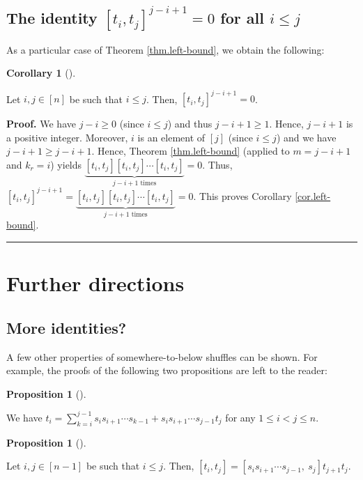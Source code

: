 \documentclass[numbers=enddot,12pt,final,onecolumn,notitlepage]{scrartcl}%
\theoremstyle{definition}
\newtheorem{prop}[theo]{Proposition}
\newenvironment{proposition}[1][]
{\begin{prop}[#1]\begin{leftbar}}
{\end{leftbar}\end{prop}}
\newtheorem{coro}[theo]{Corollary}
\newenvironment{corollary}[1][]
{\begin{coro}[#1]\begin{leftbar}}
{\end{leftbar}\end{coro}}
\newenvironment{proof}[1][Proof]{\noindent\textbf{#1.} }{\ \rule{0.5em}{0.5em}}
\let\sumnonlimits\sum
\renewcommand{\sum}{\sumnonlimits\limits}
\begin{document}
\subsection{The identity $\left[  t_{i},t_{j}\right]  ^{j-i+1}=0$ for all
$i\leq j$}

As a particular case of Theorem \ref{thm.left-bound}, we obtain the following:

\begin{corollary}
\label{cor.left-bound}Let $i,j\in\left[  n\right]  $ be such that $i\leq j$.
Then, $\left[  t_{i},t_{j}\right]  ^{j-i+1}=0$.
\end{corollary}

\begin{proof}
We have $j-i\geq0$ (since $i\leq j$) and thus $j-i+1\geq1$. Hence, $j-i+1$ is
a positive integer. Moreover, $i$ is an element of $\left[  j\right]  $ (since
$i\leq j$) and we have $j-i+1\geq j-i+1$. Hence, Theorem \ref{thm.left-bound}
(applied to $m=j-i+1$ and $k_{r}=i$) yields $\underbrace{\left[  t_{i}%
,t_{j}\right]  \left[  t_{i},t_{j}\right]  \cdots\left[  t_{i},t_{j}\right]
}_{j-i+1\text{ times}}=0$. Thus, $\left[  t_{i},t_{j}\right]  ^{j-i+1}%
=\underbrace{\left[  t_{i},t_{j}\right]  \left[  t_{i},t_{j}\right]
\cdots\left[  t_{i},t_{j}\right]  }_{j-i+1\text{ times}}=0$. This proves
Corollary \ref{cor.left-bound}.
\end{proof}

\section{\label{sec.further}Further directions}

\subsection{More identities?}

A few other properties of somewhere-to-below shuffles can be shown. For
example, the proofs of the following two propositions are left to the reader:

\begin{proposition}
We have $t_{i}=\sum_{k=i}^{j-1}s_{i}s_{i+1}\cdots s_{k-1}+s_{i}s_{i+1}\cdots
s_{j-1}t_{j}$ for any $1\leq i<j\leq n$.
\end{proposition}

\begin{proposition}
Let $i,j\in\left[  n-1\right]  $ be such that $i\leq j$. Then, $\left[
t_{i},t_{j}\right]  =\left[  s_{i}s_{i+1}\cdots s_{j-1},\ s_{j}\right]
t_{j+1}t_{j}$.
\end{proposition}
\end{document}
